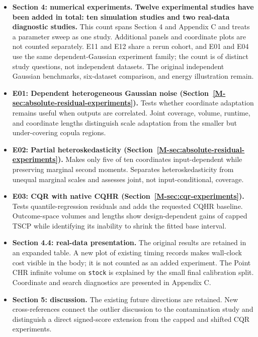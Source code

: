 \documentclass[10pt]{article}
\newcommand{\mssec}[1]{Section~\ref*{M-#1}}
\begin{document}
\begin{itemize}
\item \textbf{Section 4: numerical experiments.}
\textbf{Twelve experimental studies have been added in total: ten simulation
studies and two real-data diagnostic studies.} This count spans Section 4
and Appendix C and treats a parameter sweep as one study. Additional
panels and coordinate plots are not counted separately. E11 and E12 share
a rerun cohort, and E01 and E04 use the same dependent-Gaussian experiment
family; the count is of distinct study questions, not independent datasets.
The original independent Gaussian benchmarks, six-dataset comparison,
and energy illustration remain.
\item \textbf{E01: Dependent heterogeneous Gaussian noise (\mssec{sec:absolute-residual-experiments}).}
Tests whether coordinate adaptation remains useful when outputs are correlated. Joint coverage, volume, runtime, and coordinate lengths distinguish scale adaptation from the smaller but under-covering copula regions.

\item \textbf{E02: Partial heteroskedasticity (\mssec{sec:absolute-residual-experiments}).}
Makes only five of ten coordinates input-dependent while preserving marginal second moments. Separates heteroskedasticity from unequal marginal scales and assesses joint, not input-conditional, coverage.

\item \textbf{E03: CQR with native CQHR (\mssec{sec:cqr-experiments}).}
Tests quantile-regression residuals and adds the requested CQHR baseline. Outcome-space volumes and lengths show design-dependent gains of capped TSCP while identifying its inability to shrink the fitted base interval.

\item \textbf{Section 4.4: real-data presentation.} The original results
are retained in an expanded table. A new plot of existing timing records
makes wall-clock cost visible in the body; it is not counted as an added
experiment. The Point CHR infinite volume on \texttt{stock} is explained
by the small final calibration split. Coordinate and search diagnostics
are presented in Appendix C.

\item \textbf{Section 5: discussion.} The existing future directions are
retained. New cross-references connect the outlier discussion to the
contamination study and distinguish a direct signed-score extension from
the capped and shifted CQR experiments.
\end{itemize}
\end{document}
